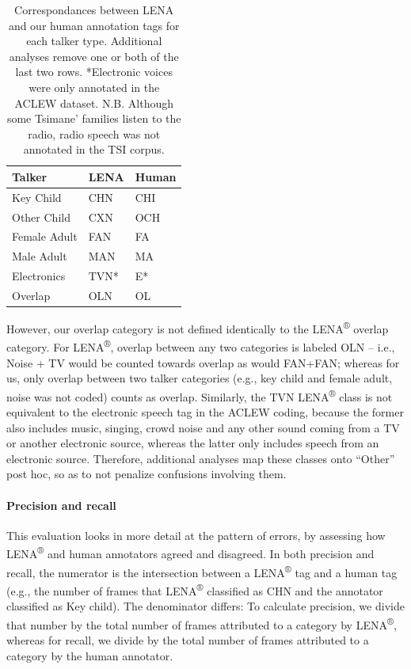 \documentclass[english,table,man,floatsintext]{apa6}
\let\oldparagraph\paragraph
\renewcommand{\paragraph}[1]{\oldparagraph{#1}\mbox{}}
\begin{document}
\begin{table}

\caption{\label{tab:tab-tsicor}Correspondances between LENA and our human annotation tags for each talker type. Additional analyses remove one or both of the last two rows. *Electronic voices were only annotated in the ACLEW dataset. N.B. Although some Tsimane' families listen to the radio, radio speech was not annotated in the TSI corpus.}
\centering
\begin{tabular}[t]{>{\raggedright\arraybackslash}p{4cm}>{\raggedright\arraybackslash}p{2cm}>{\raggedright\arraybackslash}p{2cm}}
\toprule
Talker & LENA & Human\\
\midrule
Key Child & CHN & CHI\\
Other Child & CXN & OCH\\
Female Adult & FAN & FA\\
Male Adult & MAN & MA\\
Electronics & TVN* & E*\\
\addlinespace
Overlap & OLN & OL\\
\bottomrule
\end{tabular}
\end{table}

However, our overlap category is not defined identically to the
LENA\textsuperscript{®} overlap category. For LENA\textsuperscript{®},
overlap between any two categories is labeled OLN -- i.e., Noise + TV
would be counted towards overlap as would FAN+FAN; whereas for us, only
overlap between two talker categories (e.g., key child and female adult,
noise was not coded) counts as overlap. Similarly, the TVN
LENA\textsuperscript{®} class is not equivalent to the electronic speech
tag in the ACLEW coding, because the former also includes music,
singing, crowd noise and any other sound coming from a TV or another
electronic source, whereas the latter only includes speech from an
electronic source. Therefore, additional analyses map these classes onto
\enquote{Other} post hoc, so as to not penalize confusions involving
them.

\paragraph{Precision and recall}\label{precision-and-recall}

This evaluation looks in more detail at the pattern of errors, by
assessing how LENA\textsuperscript{®} and human annotators agreed and
disagreed. In both precision and recall, the numerator is the
intersection between a LENA\textsuperscript{®} tag and a human tag
(e.g., the number of frames that LENA\textsuperscript{®} classified as
CHN and the annotator classified as Key child). The denominator differs:
To calculate precision, we divide that number by the total number of
frames attributed to a category by LENA\textsuperscript{®}, whereas for
recall, we divide by the total number of frames attributed to a category
by the human annotator.
\end{document}
